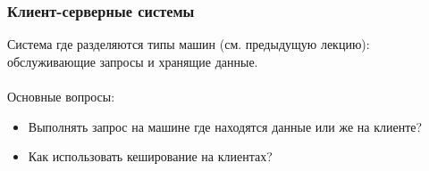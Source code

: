 \documentclass{beamer}
\begin{document}
\begin{frame}
\frametitle{Клиент-серверные системы}

Система где разделяются типы машин (см. предыдущую лекцию): обслуживающие запросы и хранящие данные.\\~\\

Основные вопросы:

\begin{itemize}
  \setlength\itemsep{1em}

  \item Выполнять запрос на машине где находятся данные или же на клиенте?
  \item Как использовать кеширование на клиентах?

\end{itemize}

\end{frame}
\end{document}
